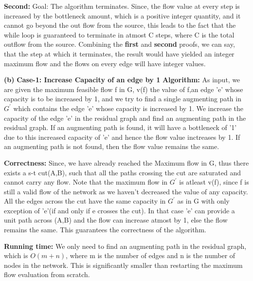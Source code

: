 \documentclass{article}
\renewcommand\part[1]{\vspace{.10in}\textbf{(#1)}}
\newcommand\algo{\vspace{.10in}\textbf{Algorithm: }}
\newcommand\correctness{\vspace{.10in}\textbf{Correctness: }}
\newcommand\runtime{\vspace{.10in}\textbf{Running time: }}
\begin{document}
    \textbf {Second:} Goal: The algorithm terminates. \newline
    Since, the flow value at every step is increased by the bottleneck amount, which is a positive integer quantity, and it cannot go beyond the out flow from the source, this leads to the fact that the while loop is guaranteed to terminate in atmost C steps, where C is the total outflow from the source. \newline
    Combining the \textbf {first} and \textbf {second} proofs, we can say, that the step at which it terminates, the result would have yielded an integer maximum flow and the flows on every edge will have integer values. \newline

    \part{b} 
    \textbf{Case-1: Increase Capacity of an edge by 1} \newline    
    \algo As input, we are given the maximum feasible flow f in G, v(f) the value of f,an edge 'e' whose capacity is to be increased by 1, and we try to find a single augmenting path in $G^\prime$ which contains the edge 'e' whose capacity is increased by 1. We increase the capacity of the edge 'e' in the residual graph and find an augmenting path in the residual graph. If an augmenting path is found, it will have a bottleneck of '1' due to this increased capacity of 'e' and hence the flow value inctreases by 1. If an augmenting path is not found, then the flow value remains the same. \newline

    \correctness  Since, we have already reached the Maximum flow in G, thus there exists a s-t cut(A,B), such that all the paths crossing the cut are saturated and cannot carry any flow. Note that the maximum flow in $G^\prime$ is atleast v(f), since f is still a valid flow of the network as we haven't decreased the value of any capacity. All the edges across the cut have the same capacity in $G^\prime$ as in G with only exception of 'e'(if and only if e crosses the cut). In that case 'e' can provide a unit path across (A,B) and the flow can increase atmost by 1, else the flow remains the same. This guarantees the correctness of the algorithm. \newline

    \runtime We only need to find an augmenting path in the residual graph, which is $O(m+n)$, where m is the number of edges and n is the number of nodes in the network. This is significantly smaller than restarting the maximum flow evaluation from scratch. \newline
\end{document}
